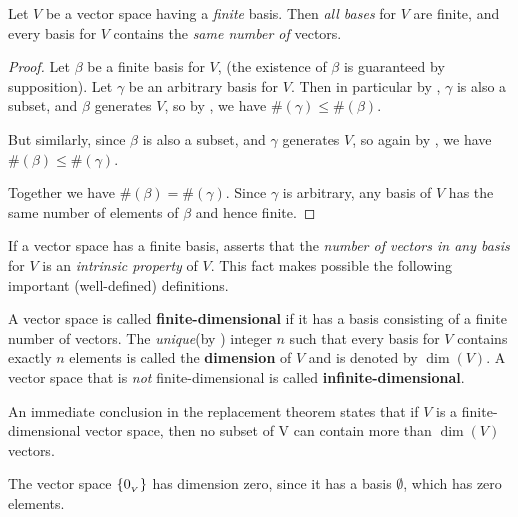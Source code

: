 \begin{corollary} \label{corollary 1.10.1}
Let \(V\) be a vector space having a \emph{finite} basis.
Then \emph{all bases} for \(V\) are finite, and every basis for \(V\) contains the \emph{same number of} vectors.
\end{corollary}

\begin{proof}
Let \(\beta\) be a finite basis for \(V\), (the existence of \(\beta\) is guaranteed by supposition).
Let \(\gamma\) be an arbitrary basis for \(V\).
Then in particular by , \(\gamma\) is also a \LID{} subset, and \(\beta\) generates \(V\), so by , we have \(\#(\gamma) \le \#(\beta)\).

But similarly, since \(\beta\) is also a \LID{} subset, and \(\gamma\) generates \(V\), so again by , we have \(\#(\beta) \le \#(\gamma)\).

Together we have \(\#(\beta) = \#(\gamma)\).
Since \(\gamma\) is arbitrary, any basis of \(V\) has the same number of elements of \(\beta\) and hence finite.
\end{proof}

\begin{remark} \label{remark 1.6.3}
If a vector space has a finite basis,  asserts that the \emph{number of vectors in any basis} for \(V\) is an \emph{intrinsic property} of \(V\).
This fact makes possible the following important (well-defined) definitions.
\end{remark}

\begin{definition} \label{def 1.9}
A vector space is called \textbf{finite-dimensional} if it has a basis consisting of a finite number of vectors.
The \emph{unique}(by ) integer \(n\) such that every basis for \(V\) contains exactly \(n\) elements is called the \textbf{dimension} of \(V\) and is denoted by \(\dim(V)\).
A vector space that is \emph{not} finite-dimensional is called \textbf{infinite-dimensional}.
\end{definition}

\begin{corollary} \label{corollary 1.10.2}
An immediate conclusion in the replacement theorem states that if \(V\) is a finite-dimensional vector space, then no \LID{} subset of V can contain more than \(\dim(V)\) vectors.
\end{corollary}

\begin{example} \label{example 1.6.7}
The vector space \(\{ 0_{_V} \}\) has dimension zero, since it has a basis \(\emptyset\), which has zero elements.
\end{example}

